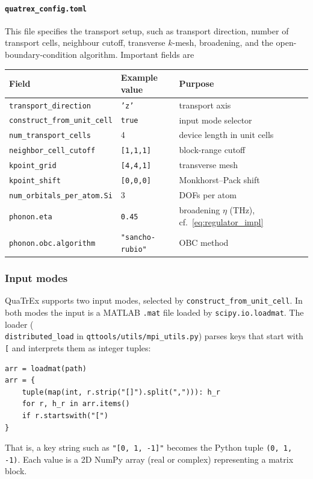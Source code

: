 \paragraph{\texttt{quatrex\_config.toml}}
This file specifies the transport setup, such as transport direction,
number of transport cells, neighbour cutoff, transverse $k$-mesh,
broadening, and the open-boundary-condition algorithm.  Important fields are
\begin{center}
\begin{tabular}{lll}
  \toprule
  Field & Example value & Purpose \\
  \midrule
  \texttt{transport\_direction}       & \texttt{'z'}            & transport axis \\
  \texttt{construct\_from\_unit\_cell}& \texttt{true}           & input mode selector \\
  \texttt{num\_transport\_cells}      & 4                       & device length in unit cells \\
  \texttt{neighbor\_cell\_cutoff}     & \texttt{[1,1,1]}        & block-range cutoff \\
  \texttt{kpoint\_grid}               & \texttt{[4,4,1]}        & transverse mesh \\
  \texttt{kpoint\_shift}              & \texttt{[0,0,0]}        & Monkhorst--Pack shift \\
  \texttt{num\_orbitals\_per\_atom.Si}& 3                       & DOFs per atom \\
  \texttt{phonon.eta}                 & \texttt{0.45}           & broadening $\eta$ (THz), cf.\ \cref{eq:regulator_impl} \\
  \texttt{phonon.obc.algorithm}       & \texttt{"sancho-rubio"} & OBC method \\
  \bottomrule
\end{tabular}
\end{center}

\subsubsection{Input modes}
\label{sec:input_modes}

QuaTrEx supports two input modes, selected by
\texttt{construct\_from\_unit\_cell}.  In both modes the input is a
MATLAB \texttt{.mat} file loaded by \texttt{scipy.io.loadmat}.  The
loader (\\\texttt{distributed\_load} in
\texttt{qttools/utils/mpi\_utils.py}) parses keys that start with
\texttt{[} and interprets them as integer tuples:
\begin{lstlisting}
arr = loadmat(path)
arr = {
    tuple(map(int, r.strip("[]").split(","))): h_r
    for r, h_r in arr.items()
    if r.startswith("[")
}
\end{lstlisting}
That is, a key string such as \texttt{"[0, 1, -1]"} becomes the Python
tuple \texttt{(0, 1, -1)}.  Each value is a 2D NumPy array (real or
complex) representing a matrix block.

